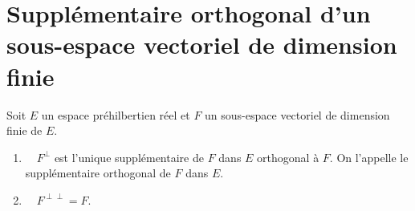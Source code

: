 \documentclass[../main.tex]{subfiles}
\begin{document}
\section{Supplémentaire orthogonal d'un sous-espace vectoriel de dimension finie}
\begin{tcolorbox}[title=Théorème 34.38, title filled=false, colframe=orange, colback=orange!10!white]
    Soit $E$ un espace préhilbertien réel et $F$ un sous-espace vectoriel de dimension finie de $E$.
    \begin{enumerate}
        \item $\quad F^{\perp}$ est l'unique supplémentaire de $F$ dans $E$ orthogonal à $F$. On l'appelle le supplémentaire orthogonal de $F$ dans $E$.
        \item $\quad F^{\perp \perp}=F$.
    \end{enumerate}
\end{tcolorbox}
\end{document}
